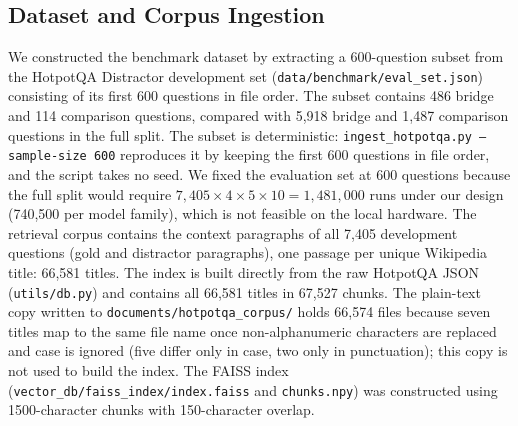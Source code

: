\documentclass[10pt]{article}
\begin{document}
\subsection{Dataset and Corpus Ingestion}
We constructed the benchmark dataset by extracting a 600-question subset from the HotpotQA Distractor development set \citep{yang2018hotpotqa} (\texttt{data/benchmark/eval\_set.json}) consisting of its first 600 questions in file order. The subset contains 486 bridge and 114 comparison questions, compared with 5,918 bridge and 1,487 comparison questions in the full split. The subset is deterministic: \texttt{ingest\_hotpotqa.py --sample-size 600} reproduces it by keeping the first 600 questions in file order, and the script takes no seed. We fixed the evaluation set at 600 questions because the full split would require $7{,}405 \times 4 \times 5 \times 10 = 1{,}481{,}000$ runs under our design (740,500 per model family), which is not feasible on the local hardware. The retrieval corpus contains the context paragraphs of all 7,405 development questions (gold and distractor paragraphs), one passage per unique Wikipedia title: 66,581 titles. The index is built directly from the raw HotpotQA JSON (\texttt{utils/db.py}) and contains all 66,581 titles in 67,527 chunks. The plain-text copy written to \texttt{documents/hotpotqa\_corpus/} holds 66,574 files because seven titles map to the same file name once non-alphanumeric characters are replaced and case is ignored (five differ only in case, two only in punctuation); this copy is not used to build the index. The FAISS index \citep{johnson2019billion} (\texttt{vector\_db/faiss\_index/index.faiss} and \texttt{chunks.npy}) was constructed using 1500-character chunks with 150-character overlap.
\end{document}
